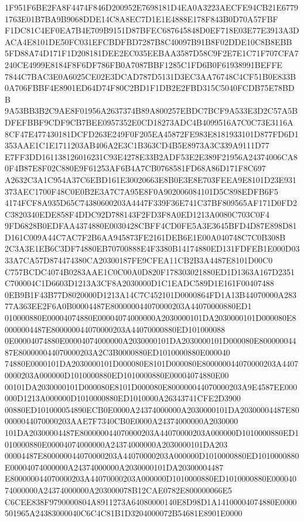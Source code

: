 \documentclass[UTF8,fontset=fandol,zihao=-4,a4paper]{ctexart}
\begin{document}
{{1F951F6BE2FA8F4474F846D200952E7698181D4EA0A3223AECFE94CB21E67791763E01B7BA9B9068DDE14C8A8EC7D1E1E4888E178F843B0D70A57FBF
F1DC81C4EF0EA7B4E709B9151D87BFEC687645848D0EF718E03E77E3913A3DACA4E8101DE50FC031EFCBDFBD7287B8C40097B91B8F02DDE10C8B8EBB
5FD88A74D171F1D208181DEE2EC035EEBAA3587D58C9F2E7E1C71F707CFA7240CE4999E8184F8F6DF786FB0A7087BBF1285C1FD6B0F61938991BEFFE
7844C7BAC3E0A6025CE02E3DCAD787D5131D3EC3AA76748C4CF51B0E833B0A706FBBF4E8901ED64D74F80C2BD1F1DB2E2FBD315C5040FCDB75E78BDB
9A53BB3B2C9AE8F01956A2637374B89A800257EBDC7BCF9A533E3D2C57A5BDFEFBBF9CDF9CB7BEE0957352E0CD18273ADC4B4099516A7C0C73E3116A
8CF47E477430181DCFD263E249F0F205EA45872FE983E8181933101D877FD6D1353AAE1C1E1711203AB406A2E3C1B363CD4B5E8973A3C339A9111D77
E7FF3DD161138126016231C93E4278E33B2ADF53E2E389F21956A24374006CA80F4B87E8F02C880E9F61253AF6B4A7CB0768581FD68A86D171F8C697
A2632C3A1C954A37C6EBD161E30020663E8B0E3E8E703FEEA9E8101D23E931373AEC1700F48C0E0B2E3A7C7A95E8F0A902006084101D5C898EDFB6F5
4174FCF8A935D65C74380600203A4447F339F36E741C37BF809565AF171D0FD2C3820340EDE858F4DDC92D788143F2FD3F8A0ED1213A0080C703C0F4
9FD6828B0EDFAA4374880E0030428CBFF4CD0FE5A3E3645BFD4D87E898D81D161C009A44C7AC7F2B6AA945873FE2161DEB6E1E00A040748C7C0B308B
2C3A3E1EB6C3DF74880EB70700888E4F3380B14174880ED131FDFEB1E000D0333A7CA57D874474380CA20300187FE9CFEA11CB2B3A4487E8101D00C0
C757BCDC4074B0283AAE1C0C00A0D820F178303021880ED1D1363A167D2351C700004C1D6603D1213A3CF8A2030000D1C1EADC589D1E161F00407488
0EB9B1F43B77D8020000D1213A14C7C452101D0000864FD1A13B44070000A28377A363EE2F6A0B00004487E800000044070000203A44070000880ED1
010000880E00004074880E00004074000000A2030000101DA2030000101D000080E80000004487E800000044070000203A44070000880ED101000088
0E00004074880E00004074000000A2030000101DA2030000101D000080E80000004487E800000044070000203A2C3B0000880ED1010000880E000040
74880E0000101DA2030000101D000080E8101D000080E800000044070000203A44070000203A000000D1010000880ED1010000880E00004074880E00
00101DA2030000101D000080E8101D000080E800000044070000203A9E4587EE000000D1213A000000D1010000880ED1010000A26343741CFE2D3900
00880ED101000054890ECB0E0000A24374000000A2030000101DA20300004487E800000044070000203AAE7F7340CB0E0000A24374000000A2030000
101DA20300004487E800000044070000203A44070000203A000000D1010000880ED1010000880E00004074000000A24374000000A2030000101DA203
00004487E800000044070000203A44070000203A000000D1010000880ED1010000880E00004074000000A24374000000A2030000101DA20300004487
E800000044070000203A44070000203A000000D1010000880ED1010000880E00004074000000A24374000000A203000078B12CAE0782E800000066E5
C6CEE838F9790000804A8911273A64080000140E8D98D1A14100004074880E0000501965A24383000040C6C4C81B1D3204000072B54681E8901E0000
}}
\end{document}
